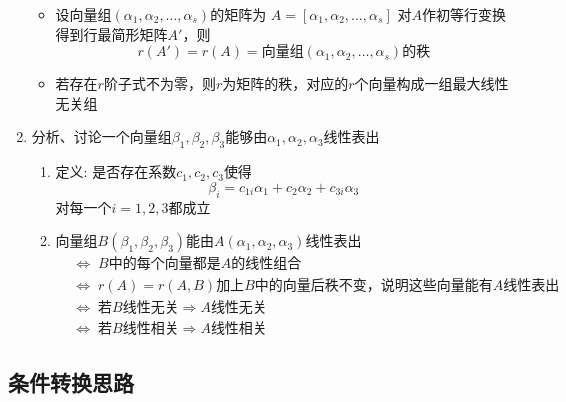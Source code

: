 \documentclass[a4paper,12pt]{article}
\begin{document}
\begin{enumerate}
\begin{itemize}
            \item 设向量组$(\alpha_1, \alpha_2, \dots, \alpha_s)$的矩阵为 $A = [\alpha_1, \alpha_2, \dots, \alpha_s]$ 对$A$作初等行变换得到行最简形矩阵$A'$，则
            \[
                r(A') = r(A) = \text{向量组}(\alpha_1, \alpha_2, \dots, \alpha_s)\text{的秩}
            \]
            \item 若存在$r$阶子式不为零，则$r$为矩阵的秩，对应的$r$个向量构成一组最大线性无关组
        \end{itemize}
        \item 分析、讨论一个向量组$\beta_1, \beta_2, \beta_3$能够由$\alpha_1, \alpha_2, \alpha_3$线性表出
        \begin{enumerate}
            \item 定义: 是否存在系数$c_1, c_2, c_3$使得
            \[
                \beta_i = c_{1i}\alpha_1 + c_{2}\alpha_2 + c_{3i}\alpha_3
            \]对每一个$i = 1, 2, 3$都成立
            \item 向量组$B(\beta_1, \beta_2, \beta_3)$能由$A(\alpha_1, \alpha_2, \alpha_3)$线性表出
            \begin{align*}
                &\Leftrightarrow\; B\text{中的每个向量都是}A\text{的线性组合} \\
                &\Leftrightarrow\; r(A) = r(A, B) \text{加上}B\text{中的向量后秩不变，说明这些向量能有}A\text{线性表出} \\
                &\Leftrightarrow\; \text{若}B\text{线性无关} \Rightarrow A\text{线性无关} \\
                &\Leftrightarrow\; \text{若}B\text{线性相关} \Rightarrow A\text{线性相关}
            \end{align*}
        \end{enumerate}
    \end{enumerate}

    \subsection{条件转换思路}
\end{document}
